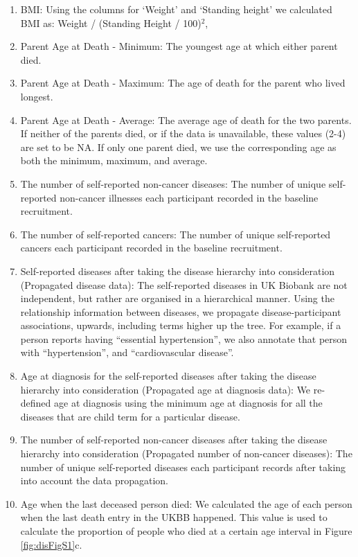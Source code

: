 \documentclass[12pt,twoside]{unicam}
\providecommand{\tightlist}{%
  \setlength{\itemsep}{0pt}\setlength{\parskip}{0pt}}
\begin{document}
\begin{enumerate}
\def\labelenumi{\arabic{enumi}.}
\tightlist
\item
  BMI: Using the columns for `Weight' and `Standing height' we calculated BMI as: Weight / (Standing Height / 100)\(^2\),
\item
  Parent Age at Death - Minimum: The youngest age at which either parent died.
\item
  Parent Age at Death - Maximum: The age of death for the parent who lived longest.
\item
  Parent Age at Death - Average: The average age of death for the two parents. If neither of the parents died, or if the data is unavailable, these values (2-4) are set to be NA. If only one parent died, we use the corresponding age as both the minimum, maximum, and average.
\item
  The number of self-reported non-cancer diseases: The number of unique self-reported non-cancer illnesses each participant recorded in the baseline recruitment.
\item
  The number of self-reported cancers: The number of unique self-reported cancers each participant recorded in the baseline recruitment.
\item
  Self-reported diseases after taking the disease hierarchy into consideration (Propagated disease data): The self-reported diseases in UK Biobank are not independent, but rather are organised in a hierarchical manner. Using the relationship information between diseases, we propagate disease-participant associations, upwards, including terms higher up the tree. For example, if a person reports having ``essential hypertension'', we also annotate that person with ``hypertension'', and ``cardiovascular disease''.
\item
  Age at diagnosis for the self-reported diseases after taking the disease hierarchy into consideration (Propagated age at diagnosis data): We re-defined age at diagnosis using the minimum age at diagnosis for all the diseases that are child term for a particular disease.
\item
  The number of self-reported non-cancer diseases after taking the disease hierarchy into consideration (Propagated number of non-cancer diseases): The number of unique self-reported diseases each participant records after taking into account the data propagation.
\item
  Age when the last deceased person died: We calculated the age of each person when the last death entry in the UKBB happened. This value is used to calculate the proportion of people who died at a certain age interval in Figure \ref{fig:disFigS1}c.
\end{enumerate}
\end{document}

